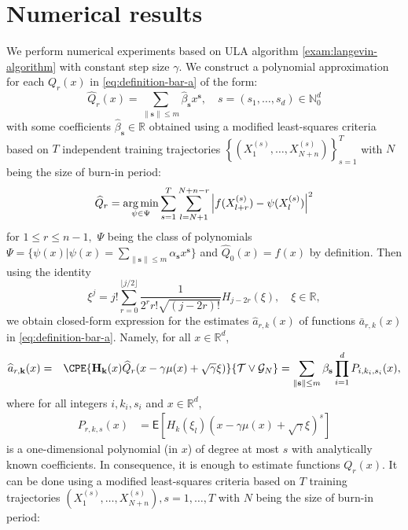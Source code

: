 \documentclass[bj]{imsart}
\def\nset{\mathbb{N}}
\def\rset{\mathbb{R}}
\def\rset{\mathbb{R}}
\def\TrainSet{\mathcal{T}}
\newcommand*{\argmin}{\operatornamewithlimits{arg\,min}}
\begin{document}
\section{Numerical results}
\label{sec:num}
We perform numerical experiments based on ULA algorithm \ref{exam:langevin-algorithm} with constant step size $\gamma$. We construct a polynomial approximation  for each \(Q_r(x)\) in \eqref{eq:definition-bar-a} of the form:
\begin{equation*}
\widehat{Q}_{r}(x) = \sum_{\|\mathbf{s}\|\leq m} \widehat\beta_{\mathbf{s}} x^{\mathbf{s}},\quad s=(s_1,\ldots,s_d) \in \nset_0^d
\end{equation*}
with some coefficients \(\widehat \beta_{\mathbf{s}}\in \mathbb{R}\) obtained using a modified least-squares criteria based on $T$ independent training trajectories \(\left\{\left(X_1^{(s)},\ldots,X_{N+n}^{(s)}\right)\right\}_{s=1}^{T}\) with $N$ being the size of burn-in period:
\begin{eqnarray}
\label{eq:Qregr}
\widehat{Q}_r = \argmin_{\psi \in \Psi} \sum_{s = 1}^{T} \sum_{l = N + 1}^{N+n-r} \left| f(X_{l+r}^{(s)}) - \psi(X_l^{(s)})\right|^2
\end{eqnarray}
for \(1 \leq r \leq n-1,\) $\Psi$ being the class of polynomials $\Psi = \{\psi(x) | \psi(x) = \sum_{\|\mathbf{s}\|\leq m} \alpha_{\mathbf{s}} x^{\mathbf{s}} \}$ and $\widehat{Q}_0(x) = f(x)$ by definition.
Then using the identity
\[
\xi^j = j! \sum_{r = 0}^{\lfloor j/2 \rfloor} \frac{1}{2^r  r! \sqrt{(j-2r)!}} H_{j-2r}(\xi),\quad \xi \in \mathbb{R},
\]
we obtain closed-form expression for the estimates $\widehat a_{r,k}(x)$ of functions $\bar a_{r,k}(x)$ in \eqref{eq:definition-bar-a}. Namely, for all $x \in \mathbb{R}^d$,
\begin{eqnarray*}
\widehat a_{r,\mathbf{k}} (x) &=&\CPE{\mathbf{H}_\mathbf{k}(x) \widehat{Q}_{r}(x - \gamma \mu(x) + \sqrt{\gamma}\xi)}{\TrainSet \vee \mathcal{G}_N}
= \sum_{\|\mathbf{s}\|\leq m} \beta_{\mathbf{s}} \prod_{i=1}^d P_{i,k_i,s_i}(x),
\end{eqnarray*}
where for all integers $i,k_i,s_i$ and $x \in \rset^d$,
\begin{align*}
P_{r,k,s}(x) &= \mathsf{E} \left[ H_{k}(\xi_l) (x - \gamma \mu(x) + \sqrt{\gamma} \xi)^{s} \right]
\end{align*}
is a one-dimensional polynomial (in \(x\)) of degree at most \(s\) with analytically known coefficients. In consequence, it is enough to estimate functions \(Q_{r}(x)\). It can be done using a modified least-squares criteria based on $T$ training trajectories \(\left(X_1^{(s)},\ldots,X_{N+n}^{(s)}\right), s = 1,\ldots,T\) with $N$ being the size of burn-in period:
\end{document}
